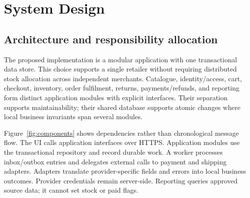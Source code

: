 \chapter{System Design}
\section{Architecture and responsibility allocation}
The proposed implementation is a modular application with one transactional data store. This choice supports a single retailer without requiring distributed stock allocation across independent merchants. Catalogue, identity/access, cart, checkout, inventory, order fulfilment, returns, payments/refunds, and reporting form distinct application modules with explicit interfaces. Their separation supports maintainability; their shared database supports atomic changes where local business invariants span several modules.

Figure~\ref{fig:components} shows dependencies rather than chronological message flow. The UI calls application interfaces over HTTPS. Application modules use the transactional repository and record durable work. A worker processes inbox/outbox entries and delegates external calls to payment and shipping adapters. Adapters translate provider-specific fields and errors into local business outcomes. Provider credentials remain server-side. Reporting queries approved source data; it cannot set stock or paid flags.

